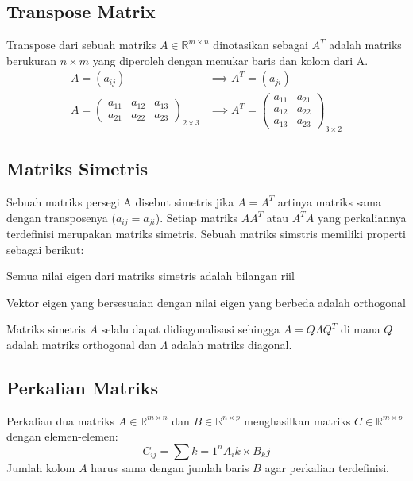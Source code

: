 \subsection{Transpose Matrix}
Transpose dari sebuah matriks $A \in \mathbb{R}^{m \times n}$ dinotasikan sebagai $A^T$ adalah matriks berukuran $n \times m$ yang diperoleh dengan menukar baris dan kolom dari A. 
\begin{align*}
    A = (a_{ij}) &\implies A^T = (a_{ji}) \\
    A = \begin{pmatrix}
        a_{11} & a_{12}  & a_{13} \\
        a_{21} & a_{22}  & a_{23}
    \end{pmatrix}_{2 \times 3}
                 &\implies
    A^T = \begin{pmatrix}
        a_{11} & a_{21} \\
        a_{12} & a_{22} \\
        a_{13} & a_{23} 
    \end{pmatrix}_{3 \times 2}
\end{align*}

\subsection{Matriks Simetris}
Sebuah matriks persegi A disebut simetris jika $A = A^T$ artinya matriks sama dengan transposenya ($a_{ij} = a_{ji}$).
Setiap matriks $AA^T$ atau $A^TA$ yang perkaliannya terdefinisi merupakan matriks simetris.
Sebuah matriks simstris memiliki properti sebagai berikut:
\begin{IEEEitemize}
    \item Semua nilai eigen dari matriks simetris adalah bilangan riil
    \item Vektor eigen yang bersesuaian dengan nilai eigen yang berbeda adalah orthogonal
    \item Matriks simetris $A$ selalu dapat didiagonalisasi sehingga $A = Q \varLambda Q^T$ di mana $Q$ adalah matriks orthogonal dan $\varLambda$ adalah matriks diagonal.
\end{IEEEitemize}

\subsection{Perkalian Matriks}
Perkalian dua matriks $A \in \mathbb{R}^{m \times n}$ dan $B \in \mathbb{R}^{n \times p}$ menghasilkan matriks $C \in \mathbb{R}^{m \times p}$ dengan elemen-elemen:
$$
C_{ij} = \sum{k = 1}^n A_ik \times B_kj
$$
Jumlah kolom $A$ harus sama dengan jumlah baris $B$ agar perkalian terdefinisi.

